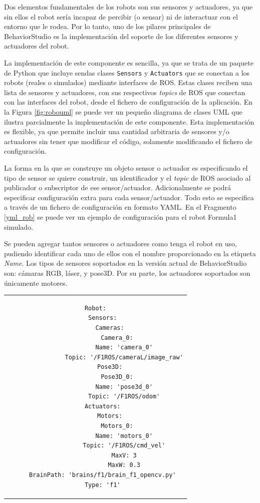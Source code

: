 Dos elementos fundamentales de los robots son sus sensores y actuadores, ya que sin ellos el robot sería incapaz de percibir (o sensar) ni de interactuar con el entorno que le rodea. Por lo tanto, uno de los pilares principales de BehaviorStudio es la implementación del soporte de los diferentes sensores y actuadores del robot.

La implementación de este componente es sencilla, ya que se trata de un paquete de Python que incluye sendas clases \texttt{Sensors} y \texttt{Actuators} que se conectan a los robots (reales o simulados) mediante interfaces de ROS. Estas clases reciben una lista de sensores y actuadores, con sus respectivos \textit{topics} de ROS que conectan con las interfaces del robot, desde el fichero de configuración de la aplicación. En la Figura \ref{fig:robouml} se puede ver un pequeño diagrama de clases UML que ilustra parcialmente la implementación de este componente. Esta implementación es flexible, ya que permite incluir una cantidad arbitraria de sensores y/o actuadores sin tener que modificar el código, solamente modificando el fichero de configuración.

La forma en la que se construye un objeto sensor o actuador es especificando el tipo de sensor se quiere construir, un identificador y el \textit{topic} de ROS asociado al publicador o subscriptor de ese sensor/actuador. Adicionalmente se podrá especificar configuración extra para cada sensor/actuador. Todo esto se especifica a través de un fichero de configuración en formato YAML. En el Fragmento \ref{yml_rob} se puede ver un ejemplo de configuración para el robot Formula1 simulado.

Se pueden agregar tantos sensores o actuadores como tenga el robot en uso, pudiendo identificar cada uno de ellos con el nombre proporcionado en la etiqueta \textit{Name}. Los tipos de sensores soportados en la versión actual de BehaviorStudio son: cámaras RGB, láser, y pose3D. Por su parte, los actuadores soportados son únicamente motores.

\begin{tabular}{c}
\begin{lstlisting}[caption={Ejemplo de configuración en formato YAML},captionpos=b,label=yml_rob]
Robot:
    Sensors:
        Cameras:
            Camera_0:
                Name: 'camera_0'
                Topic: '/F1ROS/cameraL/image_raw'
        Pose3D:
            Pose3D_0:
                Name: 'pose3d_0'
                Topic: '/F1ROS/odom'
    Actuators:
        Motors:
            Motors_0:
                Name: 'motors_0'
                Topic: '/F1ROS/cmd_vel'
                MaxV: 3
                MaxW: 0.3
    BrainPath: 'brains/f1/brain_f1_opencv.py'
    Type: 'f1'
\end{lstlisting}
\end{tabular}

